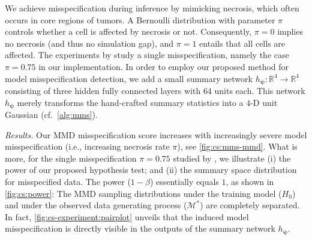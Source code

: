 \documentclass[twoside,11pt]{article}
\newcommand{\psib}{\boldsymbol{\psi}}
\newcommand{\0}{\boldsymbol{0}}
\newcommand{\M}{\mathcal{M}}
\begin{document}
We achieve misspecification during inference by mimicking necrosis, which often occurs in core regions of tumors.
A Bernoulli distribution with parameter $\pi$ controls whether a cell is affected by necrosis or not.
Consequently, $\pi=0$ implies no necrosis (and thus no simulation gap), and $\pi=1$ entails that all cells are affected.
The experiments by \citet{ward_robust_2022} study a single misspecification, namely the case $\pi=0.75$ in our implementation.
In order to employ our proposed method for model misspecification detection, we add a small summary network $h_{\psib}:\mathbb{R}^4\to\mathbb{R}^4$ consisting of three hidden fully connected layers with $64$ units each.
This network $h_{\psib}$ merely transforms the hand-crafted summary statistics into a $4$-D unit Gaussian (cf.\ \autoref{alg:mms}).

\textit{Results.}
Our MMD misspecification score increases with increasingly severe model misspecification (i.e., increasing necrosis rate $\pi$), see \autoref{fig:cs:mms-mmd}.
What is more, for the single misspecification $\pi=0.75$ studied by \citet{ward_robust_2022}, we illustrate (i) the power of our proposed hypothesis test; and (ii) the summary space distribution for misspecified data.
The power ($1-\beta$) essentially equals $1$, as shown in \autoref{fig:cs:power}: The MMD sampling distributions under the training model ($H_0$) and under the observed data generating process ($\M^*$) are completely separated.
In fact, \autoref{fig:cs-experiment:pairplot} unveils that the induced model misspecification is directly visible in the outputs of the summary network $h_{\psib}$.
\end{document}
